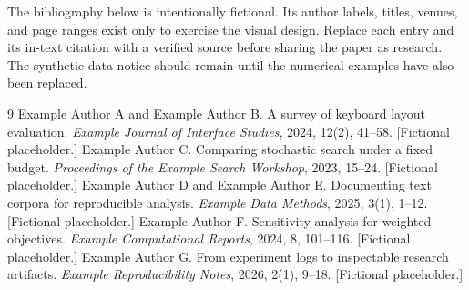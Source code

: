 \documentclass{gecko-paper}
\begin{document}
\begin{paperbody}
The bibliography below is intentionally fictional. Its author labels, titles, venues, and page ranges exist only to exercise the visual design. Replace each entry and its in-text citation with a verified source before sharing the paper as research. The synthetic-data notice should remain until the numerical examples have also been replaced.

\renewcommand{\refname}{Sample bibliography}
\begin{thebibliography}{9}
\paperbibstyle
{} Example Author A and Example Author B. A survey of keyboard layout evaluation. \textit{Example Journal of Interface Studies}, 2024, 12(2), 41–58. [Fictional placeholder.]
 Example Author C. Comparing stochastic search under a fixed budget. \textit{Proceedings of the Example Search Workshop}, 2023, 15–24. [Fictional placeholder.]
 Example Author D and Example Author E. Documenting text corpora for reproducible analysis. \textit{Example Data Methods}, 2025, 3(1), 1–12. [Fictional placeholder.]
 Example Author F. Sensitivity analysis for weighted objectives. \textit{Example Computational Reports}, 2024, 8, 101–116. [Fictional placeholder.]
 Example Author G. From experiment logs to inspectable research artifacts. \textit{Example Reproducibility Notes}, 2026, 2(1), 9–18. [Fictional placeholder.]
\end{thebibliography}
\end{paperbody}
\end{document}
